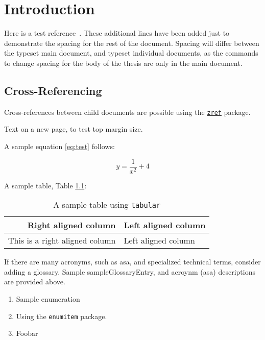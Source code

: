 \documentclass[\main/thesis.tex]{subfiles}
\begin{document}
\chapter{Introduction}

Here is a test reference~\cite{Knuth68:art_of_programming}.
These additional lines have been added just to demonstrate the spacing
for the rest of the document. Spacing will differ between the typeset main
document, and typeset individual documents, as the commands
to change spacing for the body of the thesis are only in the main document.

\section{Cross-Referencing}\label{sec:crossRef}

Cross-references between child documents are possible using the
\href{https://www.ctan.org/pkg/zref}{\texttt{zref}} package.

\newpage

Text on a new page, to test top margin size.

A sample equation \eqref{eq:test} follows:

\begin{equation}
y = \frac{1}{x^2} + 4 \label{eq:test}
\end{equation}

A sample table, Table \ref{tab:test}:

\begin{table}[h]
    \centering
    \begin{tabular}{r|l}
    \textbf{Right aligned column} & \textbf{Left aligned column} \\ \hline
    This is a right aligned column & Left aligned column
    \end{tabular}
    \caption{A sample table using \texttt{tabular}}
    \label{tab:test}
\end{table}

If there are many acronyms, such as \gls{asa}, and specialized technical terms, consider adding a glossary.
Sample \gls{sampleGlossaryEntry}, and acroynm (\gls{asa}) descriptions are provided above.

\begin{enumerate}[leftmargin=*,nosep]
    \item Sample enumeration
    \item Using the \texttt{enumitem} package.
    \item \eg Foobar
\end{enumerate}
\end{document}
